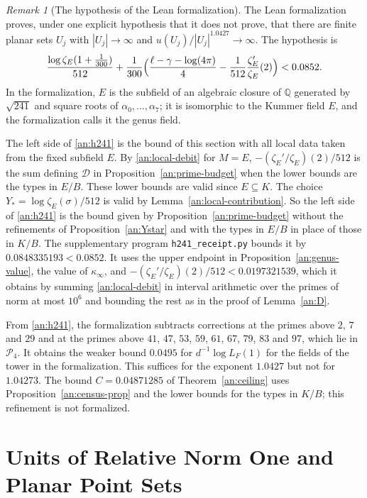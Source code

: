 \documentclass[11pt]{amsart}
\numberwithin{equation}{section}
\theoremstyle{definition}
\theoremstyle{remark}
\newtheorem{remark}[equation]{Remark}
\newcommand{\Q}{\mathbb Q}
\newcommand{\ceiling}{0.04871285}
\begin{document}
\begin{remark}[The hypothesis of the Lean formalization]\label{an:lean-hypothesis}
The Lean formalization \cite{NaslundLean2026} proves, under one explicit
hypothesis that it does not prove, that there are finite planar sets $U_j$
with $|U_j|\to\infty$ and $u(U_j)/|U_j|^{1.0427}\to\infty$. The hypothesis is
\begin{equation}\label{an:h241}
 \frac{\log\zeta_E(1+\frac1{300})}{512}
 +\frac1{300}\Bigl(\frac{\ell-\gamma-\log(4\pi)}4
 -\frac1{512}\frac{\zeta_E'}{\zeta_E}(2)\Bigr)<0.0852.
\end{equation}
In the formalization, $E$ is the subfield of an algebraic closure of $\Q$
generated by $\sqrt{241}$ and square roots of $\alpha_0,\ldots,\alpha_7$; it
is isomorphic to the Kummer field $E$, and the formalization calls it the
genus field.

The left side of \eqref{an:h241} is the bound of this section with all
local data taken from the fixed subfield $E$. By \eqref{an:local-debit} for
$M=E$, $-(\zeta_E'/\zeta_E)(2)/512$ is the sum defining $\mathcal D$ in
Proposition~\ref{an:prime-budget} when the lower bounds are the types in
$E/B$. These lower bounds are valid since $E\subseteq K$. The choice
$Y_*=\log\zeta_E(\sigma)/512$ is valid by Lemma~\ref{an:local-contribution}.
So the left side of \eqref{an:h241} is the bound given by
Proposition~\ref{an:prime-budget} without the refinements of
Proposition~\ref{an:Ystar} and with the types in $E/B$ in place of those in
$K/B$. The supplementary program \texttt{h241\_receipt.py} bounds it by
$0.0848335193<0.0852$. It uses the upper endpoint in
Proposition~\ref{an:genus-value}, the value of $\kappa_\infty$, and
$-(\zeta_E'/\zeta_E)(2)/512<0.0197321539$, which it obtains by summing
\eqref{an:local-debit} in interval arithmetic over the primes of norm at
most $10^6$ and bounding the rest as in the proof of Lemma~\ref{an:D}.

From \eqref{an:h241}, the formalization subtracts corrections at the primes
above $2$, $7$ and $29$ and at the primes above $41$, $47$, $53$, $59$,
$61$, $67$, $79$, $83$ and $97$, which lie in $\mathcal P_4$. It obtains the
weaker bound $0.0495$ for $d^{-1}\log L_F(1)$ for the fields of the tower
in the formalization. This suffices for the exponent $1.0427$ but not for
$1.04273$. The bound $C=\ceiling$ of Theorem~\ref{an:ceiling} uses
Proposition~\ref{an:census-prop} and the lower bounds for the types in
$K/B$; this refinement is not formalized.
\end{remark}
\section{Units of Relative Norm One and Planar Point Sets}
\label{geo:section}
\end{document}
